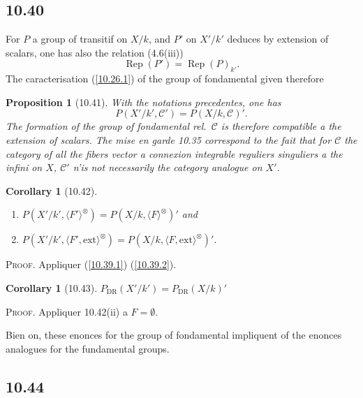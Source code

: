 \documentclass[12pt,a4paper]{article}
\theoremstyle{plain}
\newtheorem{proposition}[theorem]{Proposition}
\newtheorem{corollary}[theorem]{Corollary}
\theoremstyle{definition}
\theoremstyle{remark}
\DeclareMathOperator{\Rep}{Rep}
\newcommand{\DR}{\mathrm{DR}}
\newcommand{\ext}{\mathrm{ext}}
\begin{document}
\subsection*{10.40}

For $P$ a group of transitif on $X/k$, and $P'$ on $X'/k'$ deduces by extension of scalars, one has also the relation (4.6(iii))
$$\Rep(P') = \Rep(P)_{k'}.$$
The caracterisation (\ref{10.26.1}) of the group of fondamental given therefore
\begin{proposition}[10.41]
With the notations precedentes, one has
$$P(X'/k', \mathcal{C}') = P(X/k, \mathcal{C})'.$$
The formation of the group of fondamental rel.~$\mathcal{C}$ is therefore compatible a the extension of scalars. The mise en garde 10.35 correspond to the fait that for $\mathcal{C}$ the category of all the fibers vector a connexion integrable reguliers singuliers a the infini on $X$, $\mathcal{C}'$ n'is not necessarily the category analogue on $X'$.
\end{proposition}

\begin{corollary}[10.42]
\leavevmode
\begin{enumerate}[label=(\roman*)]
\item $P(X'/k', \langle F' \rangle^{\otimes}) = P(X/k, \langle F \rangle^{\otimes})'$ and
\item $P(X'/k', \langle F', \ext \rangle^{\otimes}) = P(X/k, \langle F, \ext \rangle^{\otimes})'$.
\end{enumerate}
\end{corollary}

\textsc{Proof.} Appliquer (\ref{10.39.1}) (\ref{10.39.2}).

\begin{corollary}[10.43]
$P_{\DR}(X'/k') = P_{\DR}(X/k)'$
\end{corollary}

\textsc{Proof.} Appliquer 10.42(ii) a $F = \emptyset$.

Bien on, these enonces for the group of fondamental impliquent of the enonces analogues for the fundamental groups.

\subsection*{10.44}
\end{document}
